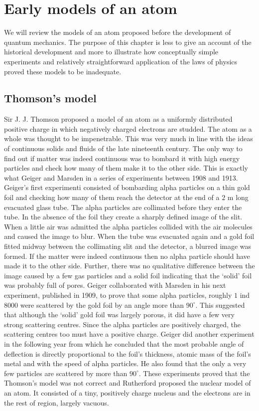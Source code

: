 \chapter{Early models of an atom}\label{c3}
We will review the models of an atom proposed before the development of quantum
mechanics. The purpose of this chapter is less to give an account of the 
historical development and more to illustrate how conceptually simple 
experiments and relatively straightforward application of the laws of physics 
proved these models to be inadequate.

\section{Thomson's model}\label{c3s1}
Sir J. J. Thomson proposed a model of an atom as a uniformly distributed 
positive charge in which negatively charged electrons are studded. The atom as
a whole was thought to be impenetrable. This was very much in line with the 
ideas of continuous solids and fluids of the late nineteenth century. The only
way to find out if matter was indeed continuous was to bombard it with high
energy particles and check how many of them make it to the other side. This
is exactly what Geiger and Marsden in a series of experiments between 1908 and
1913. Geiger's first experimenti \cite{geiger1908scattering} consisted of 
bombarding alpha particles on a thin gold foil and checking how many of them 
reach the detector at the end of a $2$ m long evacuated glass tube. The alpha 
particles are collimated before they enter the tube. In the absence of the foil 
they create a sharply defined image of the slit. When a little air was admitted 
the alpha particles collided with the air molecules and caused the image to 
blur. When the tube was evacuated again and a gold foil fitted midway between 
the collimating slit and the detector, a blurred image was formed. If the matter
were indeed continuous then no alpha particle should have made it to the other
side. Further, there was no qualitative difference between the image caused by a
few gas particles and a solid foil indicating that the `solid' foil was 
probably full of pores. Geiger collaborated with Marsden in his next experiment,
published \cite{gegier1909diffuse} in 1909, to prove that some alpha particles,
roughly $1$ ind $8000$ were scattered by the gold foil by an angle more than
$90^\circ$. This suggested that although the `solid' gold foil was largely 
porous, it did have a few very strong scattering centres. Since the alpha
particles are positively charged, the scattering centres too must have a 
positive charge. Geiger did another experiment \cite{geiger1910scattering} in 
the following year from which he concluded that the most probable angle of
deflection is directly proportional to the foil's thickness, atomic mass of
the foil's metal and with the speed of alpha particles. He also found that the
only a very few particles are scattered by more than $90^\circ$. These 
experiments proved that the Thomson's model was not correct and Rutherford 
proposed \cite{rutherform1911scattering} the nuclear model of an atom. It 
consisted of a tiny, positively charge nucleus and the electrons are in the 
rest of region, largely vacuous.

